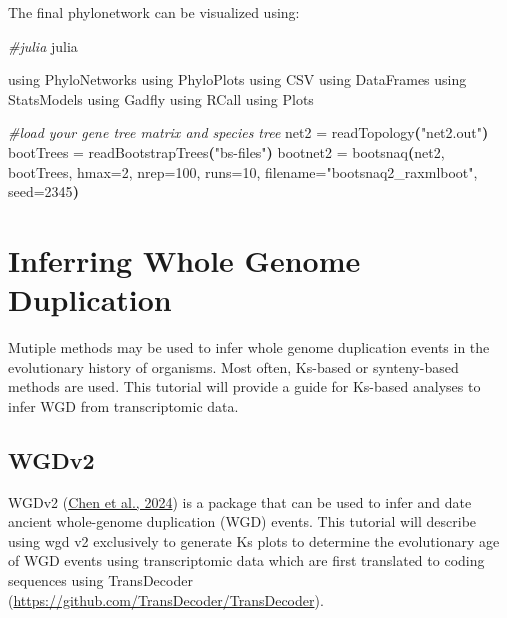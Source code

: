 \documentclass[
  12pt,
]{article}
\newenvironment{Shaded}{\begin{snugshade}}{\end{snugshade}}
\newcommand{\CommentTok}[1]{\textcolor[rgb]{0.56,0.35,0.01}{\textit{#1}}}
\newcommand{\ErrorTok}[1]{\textcolor[rgb]{0.64,0.00,0.00}{\textbf{#1}}}
\newcommand{\ExtensionTok}[1]{#1}
\newcommand{\KeywordTok}[1]{\textcolor[rgb]{0.13,0.29,0.53}{\textbf{#1}}}
\newcommand{\NormalTok}[1]{#1}
\newcommand{\StringTok}[1]{\textcolor[rgb]{0.31,0.60,0.02}{#1}}
\begin{document}
The final phylonetwork can be visualized using:

\begin{Shaded}
\begin{Highlighting}[]
\CommentTok{\#julia}
\ExtensionTok{julia}

\ExtensionTok{using}\NormalTok{ PhyloNetworks}
\ExtensionTok{using}\NormalTok{ PhyloPlots}
\ExtensionTok{using}\NormalTok{ CSV}
\ExtensionTok{using}\NormalTok{ DataFrames}
\ExtensionTok{using}\NormalTok{ StatsModels}
\ExtensionTok{using}\NormalTok{ Gadfly}
\ExtensionTok{using}\NormalTok{ RCall}
\ExtensionTok{using}\NormalTok{ Plots}

\CommentTok{\#load your gene tree matrix and species tree}
\ExtensionTok{net2}\NormalTok{ = readTopology}\ErrorTok{(}\StringTok{"net2.out"}\KeywordTok{)}
\ExtensionTok{bootTrees}\NormalTok{ = readBootstrapTrees}\ErrorTok{(}\StringTok{"bs{-}files"}\KeywordTok{)}
\ExtensionTok{bootnet2}\NormalTok{ = bootsnaq}\ErrorTok{(}\ExtensionTok{net2,}\NormalTok{ bootTrees, hmax=2, nrep=100, runs=10, filename=}\StringTok{"bootsnaq2\_raxmlboot"}\NormalTok{, seed=2345}\KeywordTok{)}
\end{Highlighting}
\end{Shaded}

\hypertarget{inferring-whole-genome-duplication}{%
\section{Inferring Whole Genome Duplication}\label{inferring-whole-genome-duplication}}

Mutiple methods may be used to infer whole genome duplication events in the evolutionary history of organisms. Most often, Ks-based or synteny-based methods are used. This tutorial will provide a guide for Ks-based analyses to infer WGD from transcriptomic data.

\hypertarget{wgdv2}{%
\subsection{WGDv2}\label{wgdv2}}

WGDv2 (\protect\hyperlink{ref-Chen2024}{Chen et al., 2024}) is a package that can be used to infer and date ancient whole-genome duplication (WGD) events. This tutorial will describe using wgd v2 exclusively to generate Ks plots to determine the evolutionary age of WGD events using transcriptomic data which are first translated to coding sequences using TransDecoder (\url{https://github.com/TransDecoder/TransDecoder}).
\end{document}
